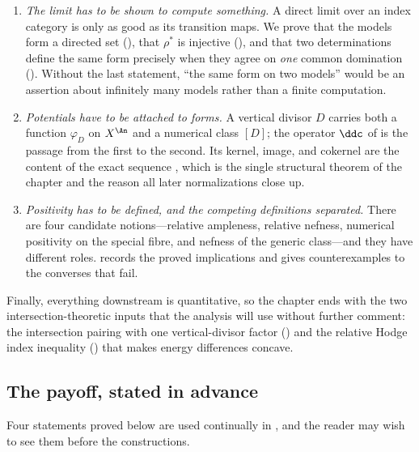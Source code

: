 \begin{enumerate}
\item\label{itm:ch20-plan:limit}
 \emph{The limit has to be shown to compute something.}  A direct limit over
 an index category is only as good as its transition maps.  We prove that
 the models form a directed set (), that
 $\rho^*$ is injective (), and that two
 determinations define the same form precisely when they agree on
 \emph{one} common domination
 ().  Without the last statement,
 ``the same form on two models'' would be an assertion about infinitely many
 models rather than a finite computation.
\item\label{itm:ch20-plan:ddc}
 \emph{Potentials have to be attached to forms.}  A vertical divisor $D$
 carries both a function $\varphi_D$ on $X^{\An}$ and a numerical class
 $[D]$; the operator $\ddc$ of  is the passage from
 the first to the second.  Its kernel, image, and cokernel are the content
 of the exact sequence , which is the single
 structural theorem of the chapter and the reason all later normalizations
 close up.
\item\label{itm:ch20-plan:positivity}
 \emph{Positivity has to be defined, and the competing definitions
 separated.}  There are four candidate notions---relative ampleness,
 relative nefness, numerical positivity on the special fibre, and nefness of
 the generic class---and they have different roles.
  records the proved implications and gives
 counterexamples to the converses that fail.
\end{enumerate}

Finally, everything downstream is quantitative, so the chapter ends with the
two intersection-theoretic inputs that the analysis will use without further
comment: the intersection pairing with one vertical-divisor factor
() and the relative Hodge index inequality
() that makes energy differences concave.

\subsection{The payoff, stated in advance}
\label{sec:ch20-payoff}

Four statements proved below are used continually in
, and the reader may wish to see
them before the constructions.

